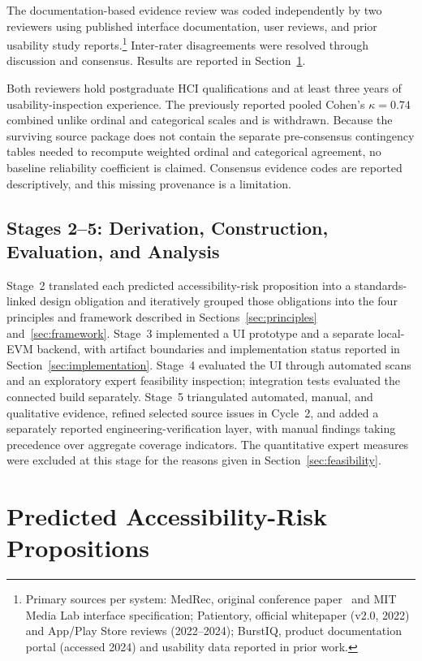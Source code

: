 \documentclass[journal]{IEEEtran}
\begin{document}
The documentation-based evidence review was coded independently by two reviewers using published interface documentation, user reviews, and prior usability study reports.\footnote{Primary sources per system: MedRec, original conference paper~\cite{medrec} and MIT Media Lab interface specification; Patientory, official whitepaper (v2.0, 2022) and App/Play Store reviews (2022--2024); BurstIQ, product documentation portal (accessed 2024) and usability data reported in prior work.} Inter-rater disagreements were resolved through discussion and consensus. Results are reported in Section~\ref{sec:barriers}.

Both reviewers hold postgraduate HCI qualifications and at least three years of usability-inspection experience. The previously reported pooled Cohen's $\kappa=0.74$ combined unlike ordinal and categorical scales and is withdrawn. Because the surviving source package does not contain the separate pre-consensus contingency tables needed to recompute weighted ordinal and categorical agreement, no baseline reliability coefficient is claimed. Consensus evidence codes are reported descriptively, and this missing provenance is a limitation.

\subsection{Stages 2--5: Derivation, Construction, Evaluation, and Analysis}
Stage~2 translated each predicted accessibility-risk proposition into a standards-linked design obligation and iteratively grouped those obligations into the four principles and framework described in Sections~\ref{sec:principles} and~\ref{sec:framework}. Stage~3 implemented a UI prototype and a separate local-EVM backend, with artifact boundaries and implementation status reported in Section~\ref{sec:implementation}. Stage~4 evaluated the UI through automated scans and an exploratory expert feasibility inspection; integration tests evaluated the connected build separately. Stage~5 triangulated automated, manual, and qualitative evidence, refined selected source issues in Cycle~2, and added a separately reported engineering-verification layer, with manual findings taking precedence over aggregate coverage indicators. The quantitative expert measures were excluded at this stage for the reasons given in Section~\ref{sec:feasibility}.
\section{Predicted Accessibility-Risk Propositions}
\label{sec:barriers}
\end{document}
